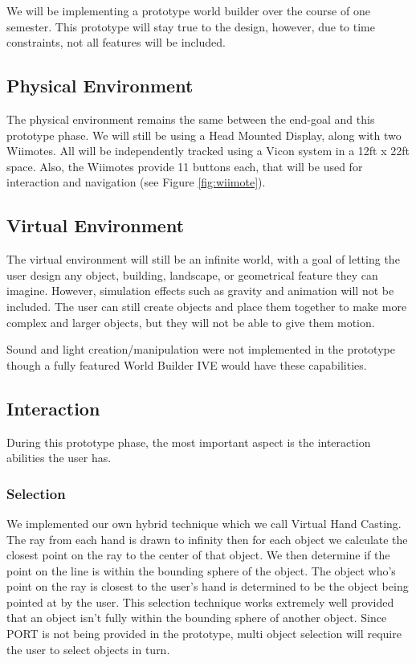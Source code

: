 We will be implementing a prototype world builder over the course of one semester.
This prototype will stay true to the design, however, due to time constraints, not all features will be included.

\subsection{Physical Environment}
The physical environment remains the same between the end-goal and this prototype phase.
We will still be using a Head Mounted Display, along with two Wiimotes.
All will be independently tracked using a Vicon system in a 12ft x 22ft space.
Also, the Wiimotes provide 11 buttons each, that will be used for interaction and navigation (see Figure \ref{fig:wiimote}).

\subsection{Virtual Environment}
The virtual environment will still be an infinite world, with a goal of letting the user design any object, building, landscape, or geometrical feature they can imagine.
However, simulation effects such as gravity and animation will not be included.
The user can still create objects and place them together to make more complex and larger objects, but they will not be able to give them motion.

Sound and light creation/manipulation were not implemented in the prototype though a fully featured World Builder IVE would have these capabilities.

\subsection{Interaction}
During this prototype phase, the most important aspect is the interaction abilities the user has.

\subsubsection{Selection}
We implemented our own hybrid technique which we call Virtual Hand Casting.
The ray from each hand is drawn to infinity then for each object we calculate the closest point on the ray to the center of that object.
We then determine if the point on the line is within the bounding sphere of the object.
The object who's point on the ray is closest to the user's hand is determined to be the object being pointed at by the user.
This selection technique works extremely well provided that an object isn't fully within the bounding sphere of another object.
Since PORT is not being provided in the prototype, multi object selection will require the user to select objects in turn.

